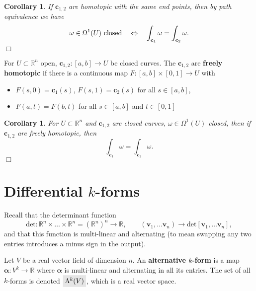 \documentclass[letter-paper]{tufte-book}
\newtheorem{corollary}[theorem]{\color{pastel-blue}Corollary}
\newcommand{\qedwhite}{\hfill \ensuremath{\Box}}
\newcommand{\highlight}[1]{\mathchoice%
  {\colorbox{black!10}{$\displaystyle#1$}}%
  {\colorbox{black!10}{$\textstyle#1$}}%
  {\colorbox{black!10}{$\scriptstyle#1$}}%
  {\colorbox{black!10}{$\scriptscriptstyle#1$}}}%
\begin{document}
\begin{corollary}
  If $\boldsymbol{c}_{1,2}$ are homotopic with the same end points, then by path equivalence we have
  \begin{equation}
    \omega \in \Omega^1(U)\textnormal{ closed}\quad \Leftrightarrow \quad \int_{\boldsymbol{c}_1} \omega = \int_{\boldsymbol{c}_2} \omega.
  \end{equation}
  \qedwhite
\end{corollary}

For $U \subset \mathbb{R}^n$ open, $\boldsymbol{c}_{1,2} : [a, b] \to U$ be closed curves. The $\boldsymbol{c}_{1,2}$ are \textbf{freely homotopic} if there is a continuous map $F: [a, b] \times [0, 1] \to U$ with
\begin{itemize}
  \item $F(s, 0) = \boldsymbol{c}_1(s)$, $F(s, 1) = \boldsymbol{c}_2(s)$ for all $s \in [a,b]$,
  \item $F(a, t) = F(b,t)$ for all $s \in [a,b]$ and $t \in [0, 1]$
\end{itemize}

\begin{corollary}
  For $U\subset \mathbb{R}^n$ and $\boldsymbol{c}_{1,2}$ are closed curves, $\omega \in \Omega^1(U)$ closed, then if $\boldsymbol{c}_{1,2}$ are freely homotopic, then
  \begin{equation*}
    \int_{\boldsymbol{c}_1} \omega = \int_{\boldsymbol{c}_2} \omega.
  \end{equation*}
  \qedwhite
\end{corollary}


\section{Differential $k$-forms}

Recall that the determinant function
\begin{equation}
  \mbox{det} : \mathbb{R}^n \times \ldots \times \mathbb{R}^n = (\mathbb{R}^n)^n \to \mathbb{R}, \qquad (\boldsymbol{v}_1, \ldots \boldsymbol{v}_n) \to \mbox{det}[\boldsymbol{v}_1, \ldots \boldsymbol{v}_n],
\end{equation}
and that this function is multi-linear and alternating (to mean swapping any two entries introduces a minus sign in the output). 

Let $V$ be a real vector field of dimension $n$. An \textbf{alternative $k$-form} is a map $\boldsymbol{\alpha} : V^k \to \mathbb{R}$ where $\boldsymbol{\alpha}$ is multi-linear and alternating in all its entries. The set of all $k$-forms is denoted $\highlight{\Lambda^k(V)}$, which is a real vector space.
\end{document}
